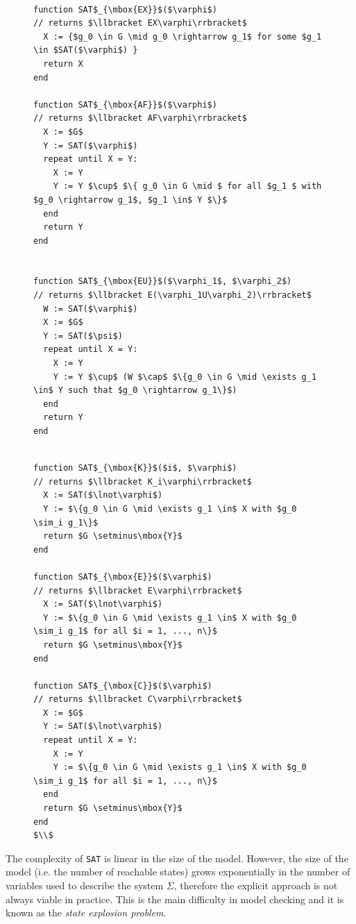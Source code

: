 \documentclass[11pt]{report}
\begin{document}
\begin{figure}
\begin{lstlisting}[mathescape]

function SAT$_{\mbox{EX}}$($\varphi$)
// returns $\llbracket EX\varphi\rrbracket$
  X := {$g_0 \in G \mid g_0 \rightarrow g_1$ for some $g_1 \in $SAT($\varphi$) }
  return X
end
 
function SAT$_{\mbox{AF}}$($\varphi$)
// returns $\llbracket AF\varphi\rrbracket$
  X := $G$
  Y := SAT($\varphi$)
  repeat until X = Y:
    X := Y
    Y := Y $\cup$ $\{ g_0 \in G \mid $ for all $g_1 $ with $g_0 \rightarrow g_1$, $g_1 \in$ Y $\}$ 
  end
  return Y
end
  

function SAT$_{\mbox{EU}}$($\varphi_1$, $\varphi_2$)
// returns $\llbracket E(\varphi_1U\varphi_2)\rrbracket$
  W := SAT($\varphi$)
  X := $G$
  Y := SAT($\psi$)
  repeat until X = Y:
    X := Y
    Y := Y $\cup$ (W $\cap$ $\{g_0 \in G \mid \exists g_1 \in$ Y such that $g_0 \rightarrow g_1\}$)
  end
  return Y
end
\end{lstlisting}
\end{figure}
\begin{figure}


\begin{lstlisting}[mathescape]

function SAT$_{\mbox{K}}$($i$, $\varphi$)
// returns $\llbracket K_i\varphi\rrbracket$
  X := SAT($\lnot\varphi$)
  Y := $\{g_0 \in G \mid \exists g_1 \in$ X with $g_0 \sim_i g_1\}$
  return $G \setminus\mbox{Y}$
end

function SAT$_{\mbox{E}}$($\varphi$)
// returns $\llbracket E\varphi\rrbracket$
  X := SAT($\lnot\varphi$)
  Y := $\{g_0 \in G \mid \exists g_1 \in$ X with $g_0 \sim_i g_1$ for all $i = 1, ..., n\}$
  return $G \setminus\mbox{Y}$
end

function SAT$_{\mbox{C}}$($\varphi$)
// returns $\llbracket C\varphi\rrbracket$
  X := $G$
  Y := SAT($\lnot\varphi$)
  repeat until X = Y:
    X := Y
    Y := $\{g_0 \in G \mid \exists g_1 \in$ X with $g_0 \sim_i g_1$ for all $i = 1, ..., n\}$
  end
  return $G \setminus\mbox{Y}$
end
$\\$
\end{lstlisting}
\end{figure}
The complexity of \texttt{SAT} is linear in the size of the model. However, the size of the model (i.e. the number of reachable states) grows exponentially in the number of variables used to describe the system $\Sigma$, therefore the explicit approach is not always viable in practice. This is the main difficulty in model checking and it is known as the \textit{state explosion problem}. 
\end{document}
